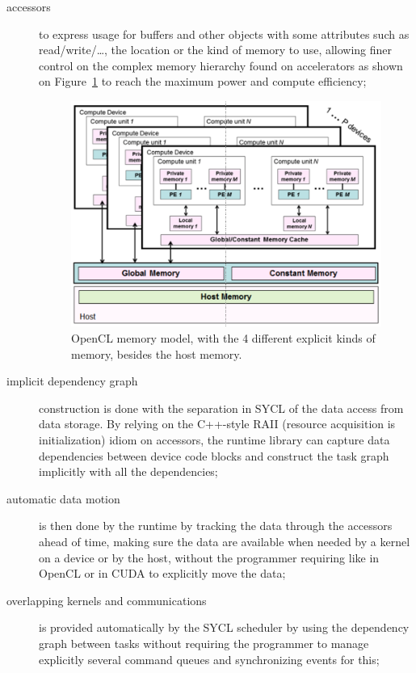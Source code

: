 \documentclass[sigplan, review]{acmart}
\begin{document}
\begin{description}
\item[accessors] to express usage for buffers and other objects with
  some attributes such as read/write/\ldots, the location or the kind
  of memory to use, allowing finer control on the complex memory
  hierarchy found on accelerators as shown on
  Figure~\ref{fig:OpenCL-memory-model} to reach the maximum power and
  compute efficiency;

  \begin{figure}
    \includegraphics[width=\hsize]{figures/memory-model}
    \caption{OpenCL memory model, with the 4 different explicit kinds
      of memory, besides the host memory.}
    \label{fig:OpenCL-memory-model}
  \end{figure}

\item[implicit dependency graph] construction is done with the
  separation in SYCL of the data access from data storage. By relying
  on the C++-style RAII (resource acquisition is initialization) idiom
  on accessors, the runtime library can capture data dependencies
  between device code blocks and construct the task graph implicitly
  with all the dependencies;

\item[automatic data motion] is then done by the runtime by tracking
  the data through the accessors ahead of time, making sure the data
  are available when needed by a kernel on a device or by the host,
  without the programmer requiring like in OpenCL or in CUDA to
  explicitly move the data;

\item[overlapping kernels and communications] is provided
  automatically by the SYCL scheduler by using the dependency graph
  between tasks without requiring the programmer to manage explicitly
  several command queues and synchronizing events for this;


\end{description}
\end{document}
